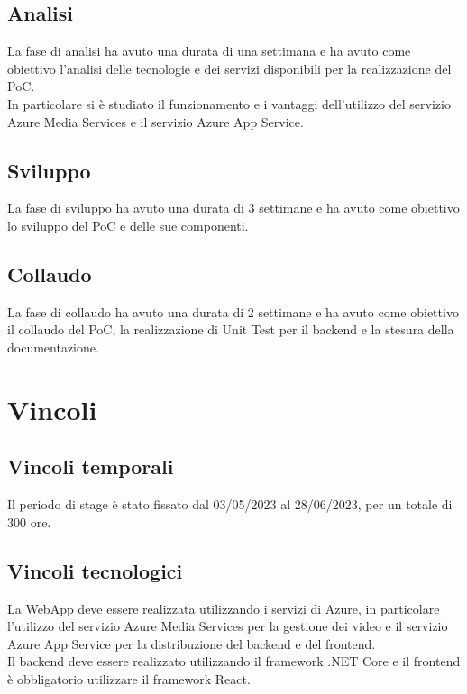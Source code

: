 \subsection{Analisi}
\label{subsec:analisi}
La fase di analisi ha avuto una durata di una settimana e ha avuto come obiettivo l'analisi delle tecnologie e dei servizi disponibili per la realizzazione del PoC.\\
In particolare si è studiato il funzionamento e i vantaggi dell'utilizzo del servizio Azure Media Services e il servizio Azure App Service.\\

\subsection{Sviluppo}
\label{subsec:sviluppo}
La fase di sviluppo ha avuto una durata di 3 settimane e ha avuto come obiettivo lo sviluppo del PoC e delle sue componenti.\\

\subsection{Collaudo}
\label{subsec:collaudo}
La fase di collaudo ha avuto una durata di 2 settimane e ha avuto come obiettivo il collaudo del PoC, la realizzazione di Unit Test per il backend e la stesura della documentazione.\\
\section{Vincoli}
\label{sec:vincoli}
\subsection{Vincoli temporali}
\label{subsec:vincoli-temporali}
Il periodo di stage è stato fissato dal 03/05/2023 al 28/06/2023, per un totale di 300 ore.\\
\subsection{Vincoli tecnologici}
\label{subsec:vincoli-tecnologici}
La WebApp deve essere realizzata utilizzando i servizi di Azure, in particolare l'utilizzo del servizio Azure Media Services per la gestione dei video e il servizio Azure App Service per la distribuzione del backend e del frontend.\\
Il backend deve essere realizzato utilizzando il framework .NET Core e il frontend è obbligatorio utilizzare il framework React.\\
